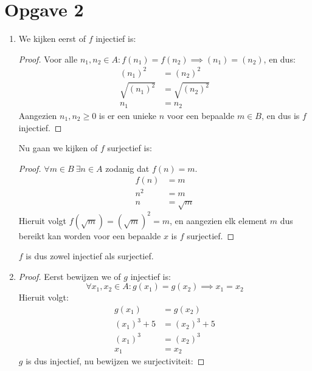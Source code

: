 \documentclass{article}
\begin{document}
\section*{Opgave 2}
    \begin{enumerate}[label=\alph*)]
        \item 
            We kijken eerst of $f$ injectief is:
            \begin{proof}
                Voor alle $n_1, n_2 \in A : f(n_1) = f(n_2) \implies (n_1)=(n_2)$, en dus: 
                \begin{align*}
                    (n_1)^2 &= (n_2)^2 \\ 
                    \sqrt{(n_1)^2} &= \sqrt{(n_2)^2} \\
                    n_1 &= n_2 
                \end{align*}
                Aangezien $n_1, n_2 \geq 0$ is er een unieke $n$ voor een bepaalde $m \in B$, en dus is $f$ injectief.
            \end{proof}
            Nu gaan we kijken of $f$ surjectief is:
            \begin{proof}
                $\forall m \in B \ \exists n \in A$ zodanig dat $f(n) = m$.
                \begin{align*}
                    f(n) &= m \\ 
                    n^2 &= m \\ 
                    n &= \sqrt{m}
                \end{align*}
                Hieruit volgt $f(\sqrt{m}) = (\sqrt{m})^2 = m$, en aangezien elk element $m$ dus bereikt kan worden voor een bepaalde $x$ is $f$ surjectief.
            \end{proof}
            $f$ is dus zowel injectief als surjectief.
        \item
            \begin{proof}
                Eerst bewijzen we of $g$ injectief is:
                \[\forall x_1, x_2 \in A : g(x_1) = g(x_2) \implies x_1 = x_2\]
                Hieruit volgt: 
                \begin{align*}
                    g(x_1) &= g(x_2) \\
                    (x_1)^3 + 5 &= (x_2)^3 + 5 \\ 
                    (x_1)^3 &= (x_2)^3 \\
                    x_1 &= x_2 
                \end{align*}
                $g$ is dus injectief, nu bewijzen we surjectiviteit:

\end{proof}
\end{enumerate}
\end{document}
